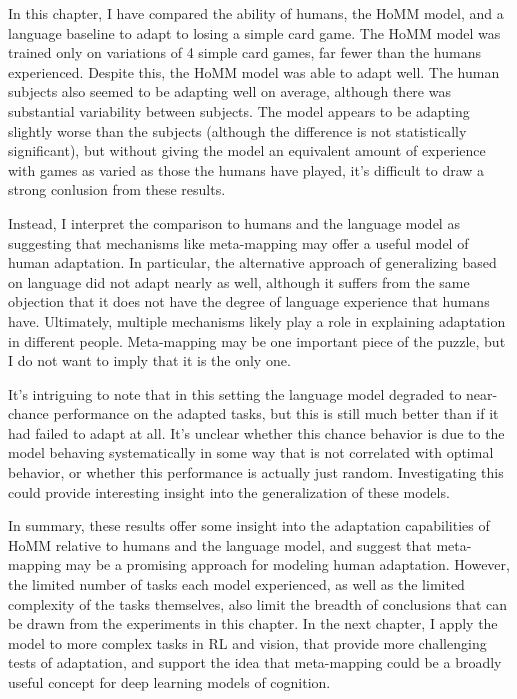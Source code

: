In this chapter, I have compared the ability of humans, the HoMM model, and a language baseline to adapt to losing a simple card game. The HoMM model was trained only on variations of 4 simple card games, far fewer than the humans experienced. Despite this, the HoMM model was able to adapt well. The human subjects also seemed to be adapting well on average, although there was substantial variability between subjects. The model appears to be adapting slightly worse than the subjects (although the difference is not statistically significant), but without giving the model an equivalent amount of experience with games as varied as those the humans have played, it's difficult to draw a strong conlusion from these results. \par
Instead, I interpret the comparison to humans and the language model as suggesting that mechanisms like meta-mapping may offer a useful model of human adaptation. In particular, the alternative approach of generalizing based on language did not adapt nearly as well, although it suffers from the same objection that it does not have the degree of language experience that humans have. Ultimately, multiple mechanisms likely play a role in explaining adaptation in different people. Meta-mapping may be one important piece of the puzzle, but I do not want to imply that it is the only one. \par 
It's intriguing to note that in this setting the language model degraded to near-chance performance on the adapted tasks, but this is still much better than if it had failed to adapt at all. It's unclear whether this chance behavior is due to the model behaving systematically in some way that is not correlated with optimal behavior, or whether this performance is actually just random. Investigating this could provide interesting insight into the generalization of these models. \par
In summary, these results offer some insight into the adaptation capabilities of HoMM relative to humans and the language model, and suggest that meta-mapping may be a promising approach for modeling human adaptation. However, the limited number of tasks each model experienced, as well as the limited complexity of the tasks themselves, also limit the breadth of conclusions that can be drawn from the experiments in this chapter. In the next chapter, I apply the model to more complex tasks in RL and vision, that provide more challenging tests of adaptation, and support the idea that meta-mapping could be a broadly useful concept for deep learning models of cognition. \par  
